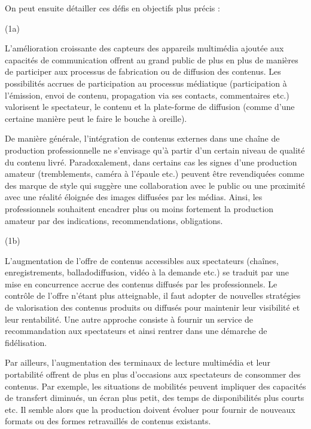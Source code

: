 On peut ensuite détailler ces défis en objectifs plus précis :
\begin{liste}
	\item[(1a)] 

	L'amélioration croissante des capteurs des appareils multimédia ajoutée aux capacités de communication offrent au grand public de plus en plus de manières de participer aux processus de fabrication ou de diffusion des contenus.
	Les possibilités accrues de participation au processus médiatique (participation à l'émission, envoi de contenu, propagation via ses contacts, commentaires etc.) valorisent le spectateur, le contenu et la plate-forme de diffusion (comme d'une certaine manière peut le faire le bouche à oreille).

	De manière générale, l'intégration de contenus externes dans une chaîne de production professionnelle ne s'envisage  qu'à partir d'un certain niveau de qualité du contenu livré.  
	Paradoxalement, dans certains cas les signes d'une production amateur (tremblements, caméra à l'épaule etc.) peuvent être revendiquées comme des marque de style qui suggère une collaboration avec le public ou une proximité avec une réalité éloignée des images diffusées par les médias.
	Ainsi, les professionnels souhaitent encadrer plus ou moins fortement la production amateur par des indications, recommendations, obligations.\\


	\item[(1b)] 

	L'augmentation de l'offre de contenus accessibles aux spectateurs (chaînes, enregistrements, balladodiffusion, vidéo à la demande etc.) se traduit par une mise en concurrence accrue des contenus diffusés par les professionnels.
	Le contrôle de l'offre n'étant plus atteignable, il faut adopter de nouvelles stratégies de valorisation des contenus produits ou diffusés pour maintenir leur visibilité et leur rentabilité. 
	Une autre approche consiste à fournir un service de recommandation aux spectateurs et ainsi rentrer dans une démarche de fidélisation. 

	Par ailleurs, l'augmentation des terminaux de lecture multimédia et leur portabilité offrent de plus en plus d'occasions aux spectateurs de consommer des contenus. 
	Par exemple, les situations de mobilités peuvent impliquer des capacités de transfert diminués, un écran plus petit, des temps de disponibilités plus courts etc.
	Il semble alors que la production doivent évoluer pour fournir de nouveaux formats ou des formes retravaillés de contenus existants.


\end{liste}
